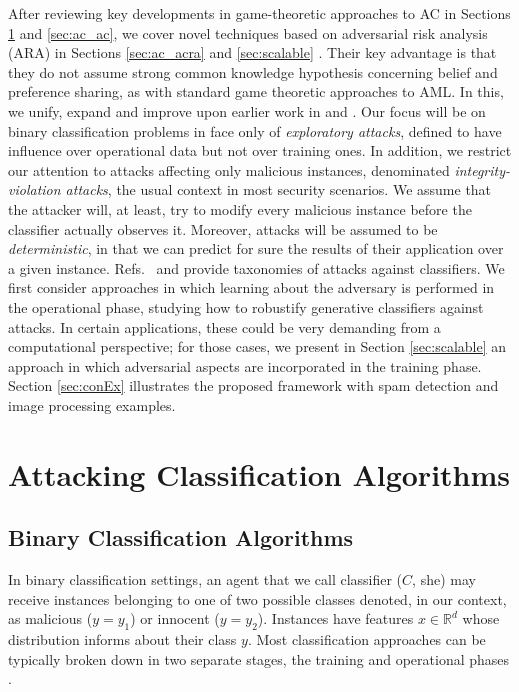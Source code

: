After reviewing key developments in game-theoretic approaches to AC in Sections \ref{sec:ac_acr} and \ref{sec:ac_ac}, we cover novel techniques based on adversarial risk analysis (ARA) in Sections  \ref{sec:ac_acra} and \ref{sec:scalable}  \parencite{adversarialRiskAnalysis2009}. Their key advantage is that they do not assume strong common knowledge hypothesis concerning belief and preference sharing, as with standard game theoretic approaches to AML. In this, we unify, expand
and improve upon earlier work in \parencite{naveiro2018adversarial} and
\parencite{gallego2020protecting}.
Our focus will be on binary classification
 problems in face only of {\em exploratory attacks}, defined to have influence over operational data but not over training ones. In addition, we restrict our attention to attacks affecting only malicious instances, denominated \textit{integrity-violation attacks}, the usual context in most security scenarios. We assume that the attacker will, at least, try to modify every malicious instance before the
classifier actually observes it. 
Moreover, attacks will be assumed to be {\em deterministic},
in that we can predict for sure the results of their 
application over a given instance.
Refs.~\parencite{AdversarialMachineLearning2011} and \parencite{Barreno2006} provide taxonomies of attacks against classifiers. %
%
We first consider approaches in which learning about the adversary is performed in the
operational phase, studying how to robustify generative classifiers against attacks. In certain applications, these  could be very demanding from a computational perspective; for those cases, we present in Section \ref{sec:scalable} an  
approach in which adversarial aspects are incorporated in the training phase.
Section \ref{sec:conEx} illustrates the proposed framework
with spam detection and image processing examples.

\section{Attacking Classification Algorithms}\label{sec:ac_acr}

\subsection{Binary Classification Algorithms}\label{sec2.1}

In binary classification settings, an agent that we call classifier ($C$, she)
may receive instances belonging to one of two possible  classes denoted, in our context, as malicious ($y=y_1$) or innocent ($y=y_2$).  Instances have  features $x \in \mathbb{R}^d$ whose distribution informs about their class $y$.  Most classification approaches can be typically broken down in two separate stages, the training and operational phases \parencite{bishop2006pattern}.
%
%

